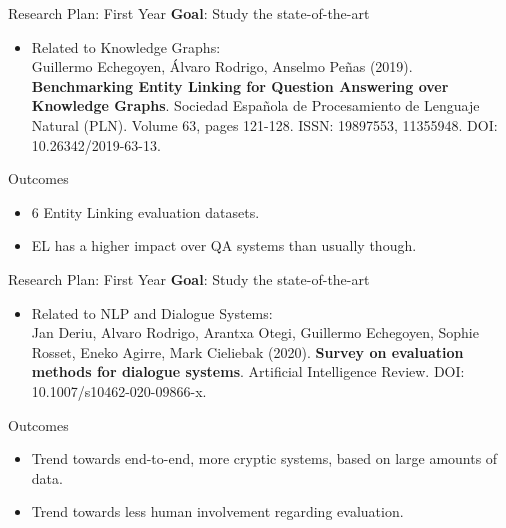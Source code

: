 \documentclass{beamer}
\begin{document}

\begin{frame}{Research Plan: First Year}
  \alert{\textbf{Goal}}: Study the state-of-the-art
  \vspace{0.2cm}
  \begin{itemize}
    \item Related to Knowledge Graphs: \\
      {\small Guillermo Echegoyen, Álvaro Rodrigo, Anselmo Peñas (2019). \textbf{Benchmarking Entity Linking for Question Answering over Knowledge Graphs}. Sociedad Espa\~nola de Procesamiento de Lenguaje Natural (PLN). Volume 63, pages 121-128. ISSN: 19897553, 11355948. DOI: 10.26342/2019-63-13. \cite{Echegoyen2019}}
  \end{itemize}
  \begin{block}{Outcomes}
    \begin{itemize}
      \item 6 Entity Linking evaluation datasets.
      \item EL has a higher impact over QA systems than usually though.
    \end{itemize}
  \end{block}
\end{frame}


\begin{frame}{Research Plan: First Year}
  \alert{\textbf{Goal}}: Study the state-of-the-art
  \vspace{0.2cm}
  \begin{itemize}
    \item Related to NLP and Dialogue Systems: \\
      {\small Jan Deriu, Alvaro Rodrigo, Arantxa Otegi, Guillermo Echegoyen, Sophie Rosset, Eneko Agirre, Mark Cieliebak (2020). \textbf{Survey on evaluation methods for dialogue systems}. Artificial Intelligence Review. DOI: 10.1007/s10462-020-09866-x. \cite{jan_survey_2020}}
  \end{itemize}
  \begin{block}{Outcomes}
    \begin{itemize}
      \item Trend towards end-to-end, more cryptic systems, based on large amounts of data.
      \item Trend towards less human involvement regarding evaluation. 
    \end{itemize}
  \end{block}
\end{frame}
\end{document}
